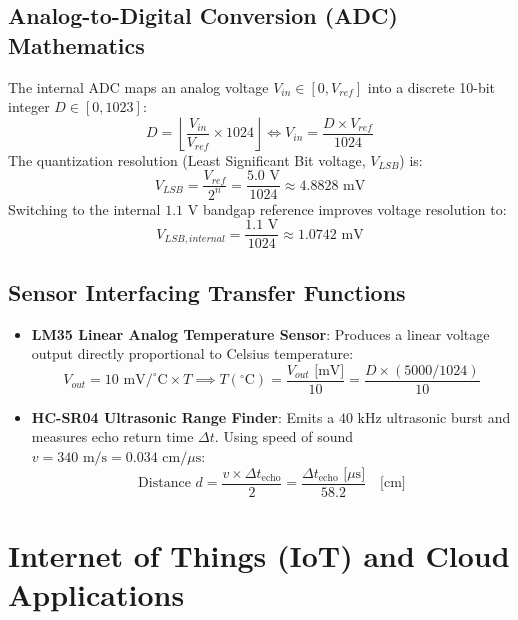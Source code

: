 \subsection{Analog-to-Digital Conversion (ADC) Mathematics}
The internal ADC maps an analog voltage $V_{in} \in [0, V_{ref}]$ into a discrete 10-bit integer $D \in [0, 1023]$:
\begin{equation}
D = \left\lfloor \frac{V_{in}}{V_{ref}} \times 1024 \right\rfloor \iff V_{in} = \frac{D \times V_{ref}}{1024}
\end{equation}
The quantization resolution (Least Significant Bit voltage, $V_{LSB}$) is:
\begin{equation}
V_{LSB} = \frac{V_{ref}}{2^n} = \frac{5.0\text{ V}}{1024} \approx 4.8828\text{ mV}
\end{equation}
Switching to the internal $1.1\text{ V}$ bandgap reference improves voltage resolution to:
\begin{equation}
V_{LSB,internal} = \frac{1.1\text{ V}}{1024} \approx 1.0742\text{ mV}
\end{equation}

\subsection{Sensor Interfacing Transfer Functions}
\begin{itemize}[leftmargin=1.5em]
    \item \textbf{LM35 Linear Analog Temperature Sensor}:
    Produces a linear voltage output directly proportional to Celsius temperature:
    \begin{equation}
    V_{out} = 10\text{ mV}/^\circ\text{C} \times T \implies T(^\circ\text{C}) = \frac{V_{out}\text{ [mV]}}{10} = \frac{D \times (5000 / 1024)}{10}
    \end{equation}
    \item \textbf{HC-SR04 Ultrasonic Range Finder}:
    Emits a $40\text{ kHz}$ ultrasonic burst and measures echo return time $\Delta t$. Using speed of sound $v = 340\text{ m/s} = 0.034\text{ cm}/\mu\text{s}$:
    \begin{equation}
    \text{Distance } d = \frac{v \times \Delta t_{\text{echo}}}{2} = \frac{\Delta t_{\text{echo}}\text{ [$\mu$s]}}{58.2} \quad \text{[cm]}
    \end{equation}
\end{itemize}

\section{Internet of Things (IoT) and Cloud Applications}

